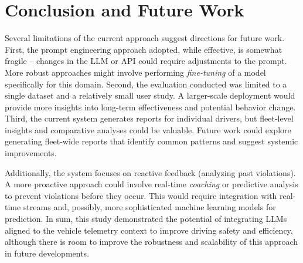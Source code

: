 \documentclass[12pt]{article}
\begin{document}
\section{Conclusion and Future Work}

Several limitations of the current approach suggest directions for future work. First, the prompt engineering approach adopted, while effective, is somewhat fragile – changes in the LLM or API could require adjustments to the prompt. More robust approaches might involve performing \textit{fine-tuning} of a model specifically for this domain. Second, the evaluation conducted was limited to a single dataset and a relatively small user study. A larger-scale deployment would provide more insights into long-term effectiveness and potential behavior change. Third, the current system generates reports for individual drivers, but fleet-level insights and comparative analyses could be valuable. Future work could explore generating fleet-wide reports that identify common patterns and suggest systemic improvements.

Additionally, the system focuses on reactive feedback (analyzing past violations). A more proactive approach could involve real-time \textit{coaching} or predictive analysis to prevent violations before they occur. This would require integration with real-time streams and, possibly, more sophisticated machine learning models for prediction. In sum, this study demonstrated the potential of integrating LLMs aligned to the vehicle telemetry context to improve driving safety and efficiency, although there is room to improve the robustness and scalability of this approach in future developments.



\end{document}
